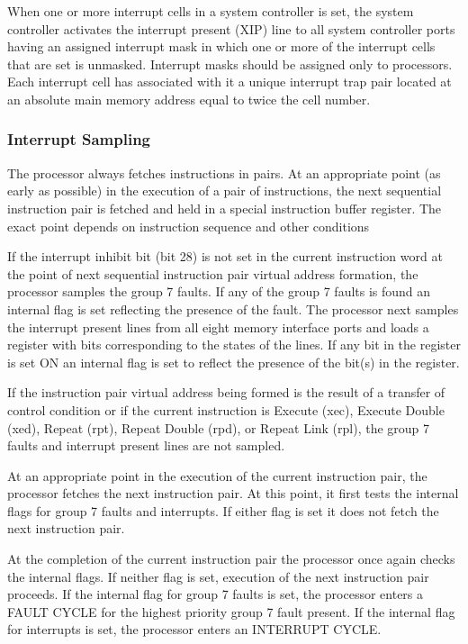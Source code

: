 When one or more interrupt cells in a system controller is set, the system
controller activates the interrupt present (XIP) line to all system controller
ports having an assigned interrupt mask in which one or more of the interrupt
cells that are set is unmasked. Interrupt masks should be assigned only to
processors. Each interrupt cell has associated with it a unique interrupt trap
pair located at an absolute main memory address equal to twice the cell number.  
\subsubsection{Interrupt Sampling}

The processor always fetches instructions in pairs. At an appropriate point (as
early as possible) in the execution of a pair of instructions, the next
sequential instruction pair is fetched and held in a special instruction buffer
register. The exact point depends on instruction sequence and other conditions

If the interrupt inhibit bit (bit 28) is not set in the current instruction
word at the point of next sequential instruction pair virtual address
formation, the processor samples the group 7 faults. If any of the group 7
faults is found an internal flag is set reflecting the presence of the fault.
The processor next samples the interrupt present lines from all eight memory
interface ports and loads a register with bits corresponding to the states of
the lines. If any bit in the register is set ON an internal flag is set to
reflect the presence of the bit(s) in the register.

If the instruction pair virtual address being formed is the result of a
transfer of control condition or if the current instruction is Execute (xec),
Execute Double (xed), Repeat (rpt), Repeat Double (rpd), or Repeat Link (rpl),
the group 7 faults and interrupt present lines are not sampled.  

At an appropriate point in the execution of the current instruction pair, the
processor fetches the next instruction pair. At this point, it first tests the
internal flags for group 7 faults and interrupts. If either flag is set it does
not fetch the next instruction pair.  

At the completion of the current instruction pair the processor once again
checks the internal flags.  If neither flag is set, execution of the next
instruction pair proceeds. If the internal flag for group 7 faults is set, the
processor enters a FAULT CYCLE for the highest priority group 7 fault present.
If the internal flag for interrupts is set, the processor enters an INTERRUPT
CYCLE.  

